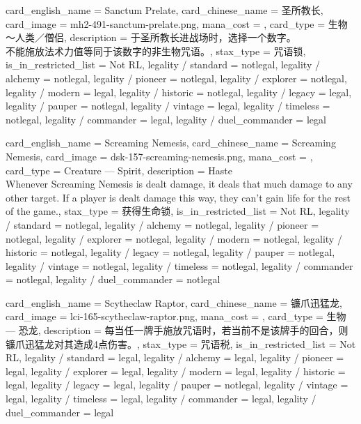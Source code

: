 \documentclass[lang = cn, color = black, 10pt]{AllThatStax}
\begin{document}
\card
{
	card_english_name = {Sanctum Prelate},
	card_chinese_name = {圣所教长},
	card_image = mh2-491-sanctum-prelate.png,
	mana_cost = ,
	card_type = 生物 ～人类／僧侣,
	description = {于圣所教长进战场时，选择一个数字。\\
		不能施放法术力值等同于该数字的非生物咒语。},
	stax_type = 咒语锁,
	is_in_restricted_list = Not RL,
	legality / standard = notlegal,
	legality / alchemy = notlegal,
	legality / pioneer = notlegal,
	legality / explorer = notlegal,
	legality / modern = legal,
	legality / historic = notlegal,
	legality / legacy = legal,
	legality / pauper = notlegal,
	legality / vintage = legal,
	legality / timeless = notlegal,
	legality / commander = legal,
	legality / duel_commander = legal
}

\card
{
	card_english_name = {Screaming Nemesis},
	card_chinese_name = {Screaming Nemesis},
	card_image = dsk-157-screaming-nemesis.png,
	mana_cost = ,
	card_type = Creature — Spirit,
	description = {Haste\\
		Whenever Screaming Nemesis is dealt damage, it deals that much damage to any other target. If a player is dealt damage this way, they can't gain life for the rest of the game.},
	stax_type = 获得生命锁,
	is_in_restricted_list = Not RL,
	legality / standard = notlegal,
	legality / alchemy = notlegal,
	legality / pioneer = notlegal,
	legality / explorer = notlegal,
	legality / modern = notlegal,
	legality / historic = notlegal,
	legality / legacy = notlegal,
	legality / pauper = notlegal,
	legality / vintage = notlegal,
	legality / timeless = notlegal,
	legality / commander = notlegal,
	legality / duel_commander = notlegal
}

\card
{
	card_english_name = {Scytheclaw Raptor},
	card_chinese_name = {镰爪迅猛龙},
	card_image = lci-165-scytheclaw-raptor.png,
	mana_cost = ,
	card_type = 生物 — 恐龙,
	description = {每当任一牌手施放咒语时，若当前不是该牌手的回合，则镰爪迅猛龙对其造成4点伤害。},
	stax_type = 咒语税,
	is_in_restricted_list = Not RL,
	legality / standard = legal,
	legality / alchemy = legal,
	legality / pioneer = legal,
	legality / explorer = legal,
	legality / modern = legal,
	legality / historic = legal,
	legality / legacy = legal,
	legality / pauper = notlegal,
	legality / vintage = legal,
	legality / timeless = legal,
	legality / commander = legal,
	legality / duel_commander = legal
}
\end{document}
